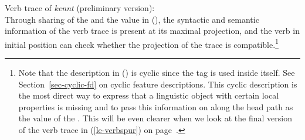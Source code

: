 \eas
Verb trace of \emph{kennt} (preliminary version):\\
\label{le-verbspur-kennt}%
\zs
Through sharing of the \localv and the \dsl value in (), the syntactic and semantic information of the verb trace
is present at its maximal projection, and the verb in initial position can check whether the
projection of the trace is compatible.\footnote{%
  Note that the description in () is cyclic since the tag  is used inside itself. See
  Section~\ref{sec-cyclic-fd} on cyclic feature descriptions. This cyclic description is the most
  direct way to express that a linguistic object with certain local properties is missing and to pass this
  information on along the head path as the value of the \dslf. This will be even clearer when we look
  at the final version of the verb trace in (\ref{le-verbspur}) on page~\pageref{le-verbspur}.%
}%

